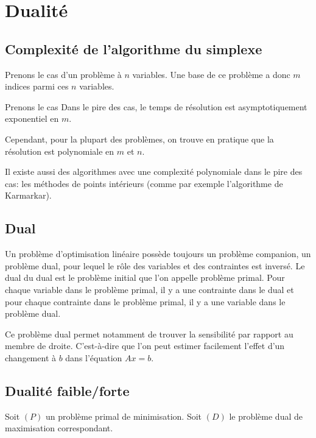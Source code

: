 \section{Dualité}

\subsection{Complexité de l'algorithme du simplexe}

Prenons le cas d'un problème à $n$ variables.
Une base de ce problème a donc $m$ indices
parmi ces $n$ variables.

Prenons le cas 
Dans le pire des cas, le temps de résolution est
asymptotiquement exponentiel en $m$.

Cependant, pour la plupart des problèmes,
on trouve en pratique que la résolution est polynomiale
en $m$ et $n$.

Il existe aussi des algorithmes avec
une complexité polynomiale dans le pire des cas:
les méthodes de points intérieurs
(comme par exemple l'algorithme de Karmarkar).

\subsection{Dual}

Un problème d’optimisation linéaire
possède toujours un problème companion, un problème dual,
pour lequel le rôle des variables et des contraintes est inversé.
Le dual du dual est le problème initial
que l’on appelle problème primal.
Pour chaque variable dans le problème primal,
il y a une contrainte dans le dual
et pour chaque contrainte dans le problème primal,
il y a une variable dans le problème dual.

Ce problème dual permet notamment de trouver
la sensibilité par rapport au membre de droite.
C'est-à-dire que l'on peut estimer facilement
l'effet d'un changement à $b$ dans l'équation
$Ax = b$.

\subsection{Dualité faible/forte}

Soit $(P)$ un problème primal de minimisation.
Soit $(D)$ le problème dual de maximisation correspondant.

